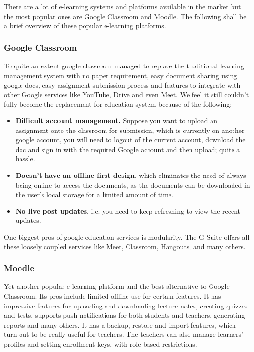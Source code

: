 There are a lot of e-learning systems and platforms available in the market 
but the most popular ones are Google Classroom and Moodle. 
The following shall be a brief overview of these popular e-learning platforms.

\subsubsection{Google Classroom}

To quite an extent google classroom managed to replace the traditional 
learning management system with no paper requirement, easy document sharing using google docs, 
easy assignment submission process and features to integrate with other Google services 
like YouTube, Drive and even Meet. 
We feel it still couldn’t fully become the replacement for education system because of the following:

\begin{itemize}
    \item \textbf{Difficult account management.} Suppose you want to upload an assignment onto the classroom for submission, 
    which is currently on another google account, you will need to logout of the current account, 
    download the doc and sign in with the required Google account and then upload; quite a hassle.
    \item \textbf{Doesn’t have an offline first design}, which eliminates the need of always being online to access the documents, 
    as the documents can be downloaded in the user’s local storage for a limited amount of time.
    \item \textbf{No live post updates}, i.e. you need to keep refreshing to view the recent updates.
\end{itemize}

One biggest pros of google education services is modularity. The G-Suite offers all these 
loosely coupled services like Meet, Classroom, Hangouts, and many others.

\subsubsection{Moodle}

Yet another popular e-learning platform and the best alternative to Google Classroom. 
Its pros include limited offline use for certain features. It has impressive features 
for  uploading and downloading lecture notes, creating quizzes and tests, supports push 
notifications for both students and teachers, generating reports and many others. 
It has a  backup, restore and import features, which turn out to be really useful for teachers. 
The teachers can also manage learners' profiles and setting enrollment keys, with role-based restrictions.

